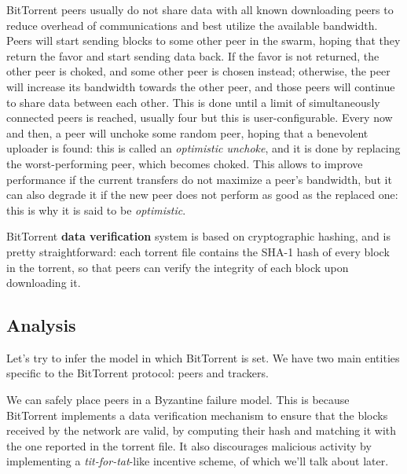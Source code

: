 \documentclass[mscthesis]{usiinfthesis}
\begin{document}
BitTorrent peers usually do not share data with all known downloading peers to reduce overhead of communications and best utilize the available bandwidth. Peers will start sending blocks to some other peer in the swarm, hoping that they return the favor and start sending data back. If the favor is not returned, the other peer is choked, and some other peer is chosen instead; otherwise, the peer will increase its bandwidth towards the other peer, and those peers will continue to share data between each other. This is done until a limit of simultaneously connected peers is reached, usually four but this is user-configurable. Every now and then, a peer will unchoke some random peer, hoping that a benevolent uploader is found: this is called an \textit{optimistic unchoke}, and it is done by replacing the worst-performing peer, which becomes choked. This allows to improve performance if the current transfers do not maximize a peer's bandwidth, but it can also degrade it if the new peer does not perform as good as the replaced one: this is why it is said to be \textit{optimistic}.

BitTorrent \textbf{data verification} system is based on cryptographic hashing, and is pretty straightforward: each torrent file contains the SHA-1 hash of every block in the torrent, so that peers can verify the integrity of each block upon downloading it.

\subsection{Analysis}

Let's try to infer the model in which BitTorrent is set. We have two main entities specific to the BitTorrent protocol: peers and trackers. 

We can safely place peers in a Byzantine failure model. This is because BitTorrent implements a data verification mechanism to ensure that the blocks received by the network are valid, by computing their hash and matching it with the one reported in the torrent file. It also discourages malicious activity by implementing a \textit{tit-for-tat}-like incentive scheme, of which we'll talk about later.
\end{document}
